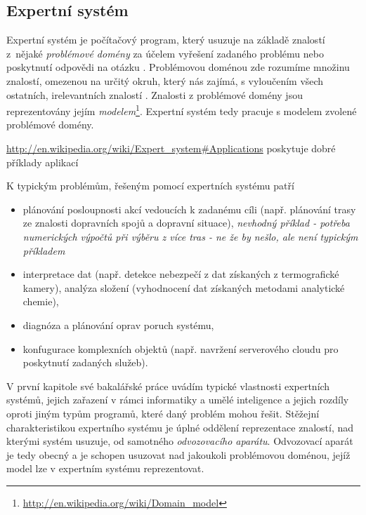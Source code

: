 \subsection{Expertní systém}

Expertní systém je počítačový program, který usuzuje na základě znalostí
z~nějaké \emph{problémové domény} za účelem vyřešení zadaného problému nebo
poskytnutí odpovědi na otázku \cite{introduction}. Problémovou doménou zde
rozumíme množinu znalostí, omezenou na určitý okruh, který nás zajímá, s
vyloučením všech ostatních, irelevantních znalostí \cite{problem-domain}.
Znalosti z problémové domény jsou reprezentovány jejím
\emph{modelem}\footnote{\url{http://en.wikipedia.org/wiki/Domain\_model}}.
Expertní systém tedy pracuje s modelem zvolené problémové domény.

\begin{framed}
  \url{http://en.wikipedia.org/wiki/Expert\_system#Applications} poskytuje dobré
  příklady aplikací
\end{framed}

K typickým problémům, řešeným pomocí expertních systému patří
\cite{introduction}
\begin{itemize}
  \item plánování posloupnosti akcí vedoucích k zadanému cíli (např.
    plánování trasy ze znalosti dopravních spojů a dopravní situace),
    \emph{nevhodný příklad - potřeba numerických výpočtů při výběru z více tras
    - ne že by nešlo, ale není typickým příkladem}
  \item interpretace dat (např. detekce nebezpečí z dat získaných z
    termografické kamery), analýza složení (vyhodnocení dat získaných metodami
    analytické chemie),
  \item diagnóza a plánování oprav poruch systému,
  \item konfugurace komplexních objektů (např. navržení serverového cloudu pro
    poskytnutí zadaných služeb).
\end{itemize}

V první kapitole své bakalářské práce \cite{bakalarka} uvádím typické vlastnosti
expertních systémů, jejich zařazení v rámci informatiky a umělé inteligence a
jejich rozdíly oproti jiným typům programů, které daný problém mohou řešit.
Stěžejní charakteristikou expertního systému je úplné oddělení reprezentace
znalostí, nad kterými systém usuzuje, od samotného \emph{odvozovacího aparátu}.
Odvozovací aparát je tedy obecný a je schopen usuzovat nad jakoukoli problémovou
doménou, jejíž model lze v expertním systému reprezentovat.

